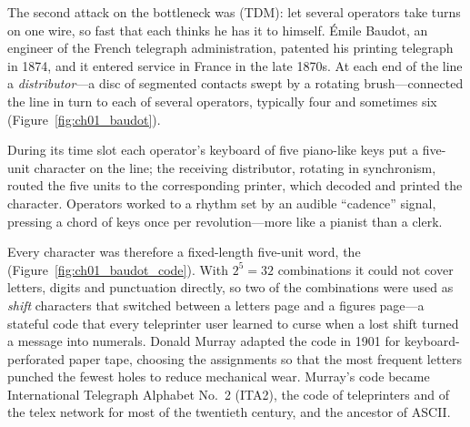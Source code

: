 The second attack on the bottleneck was  (TDM): let several
operators take turns on one wire, so fast that each thinks he has it to himself. \'Emile Baudot, an
engineer of the French telegraph administration, patented his printing telegraph in 1874, and it
entered service in France in the late 1870s. At each end of the line a \emph{distributor}---a disc of
segmented contacts swept by a rotating brush---connected the line in turn to each of several
operators, typically four and sometimes six (Figure~\ref{fig:ch01_baudot}).

During its time slot each operator's keyboard of five piano-like keys put a five-unit character on
the line; the receiving
distributor, rotating in synchronism, routed the five units to the corresponding printer, which
decoded and printed the character. Operators worked to a rhythm set by an audible ``cadence''
signal, pressing a chord of keys once per revolution---more like a pianist than a clerk.


Every character was therefore a fixed-length five-unit word, the 
(Figure~\ref{fig:ch01_baudot_code}). With $2^5=32$
combinations it could not cover letters, digits and punctuation directly, so two of the combinations
were used as \emph{shift} characters that switched between a letters page and a figures page---a
stateful code that every teleprinter user learned to curse when a lost shift turned a message into
numerals. Donald Murray adapted the code in 1901 for keyboard-perforated paper tape, choosing the
assignments so that the most frequent letters punched the fewest holes to reduce mechanical wear.
Murray's code became International Telegraph Alphabet No.~2 (ITA2), the code of teleprinters and of
the telex network for most of the twentieth century, and the ancestor of ASCII.

